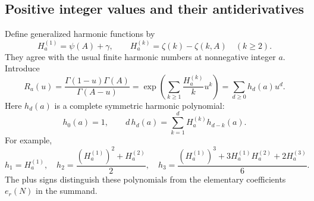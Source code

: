 \subsection{Positive integer values and their antiderivatives}

Define generalized harmonic functions by
\begin{equation}\label{harm:eq:Hcomplex}
 H_a^{(1)}=\psi(A)+\gamma,\qquad
 H_a^{(k)}=\zeta(k)-\zeta(k,A)\quad(k\geq2).
\end{equation}
They agree with the usual finite harmonic numbers at nonnegative
integer $a$.  Introduce
\begin{equation}\label{harm:eq:R}
 R_a(u)=\frac{\Gamma(1-u)\Gamma(A)}{\Gamma(A-u)}
       =\exp\left(\sum_{k\geq1}\frac{H_a^{(k)}}k u^k\right)
       =\sum_{d\geq0}h_d(a)u^d.
\end{equation}
Here $h_d(a)$ is a complete symmetric harmonic polynomial:
\begin{equation}\label{harm:eq:hrec}
 h_0(a)=1,\qquad
 d\,h_d(a)=\sum_{k=1}^d H_a^{(k)}h_{d-k}(a).
\end{equation}
For example,
\[
 h_1=H_a^{(1)},\quad
 h_2=\frac{(H_a^{(1)})^2+H_a^{(2)}}2,\quad
 h_3=\frac{(H_a^{(1)})^3+3H_a^{(1)}H_a^{(2)}+2H_a^{(3)}}6.
\]
The plus signs distinguish these polynomials from the elementary
coefficients $e_r(N)$ in the summand.

